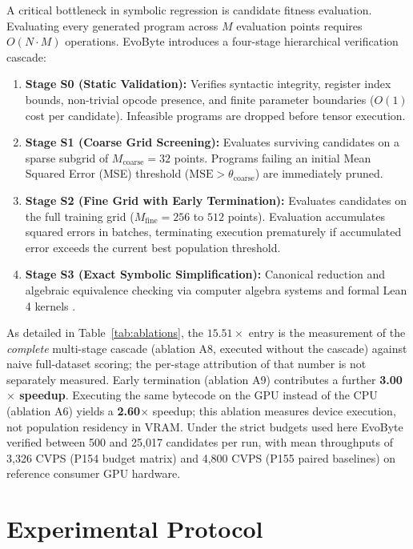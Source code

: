 \documentclass[11pt,a4paper]{article}
\begin{document}
A critical bottleneck in symbolic regression is candidate fitness evaluation. Evaluating every generated program across $M$ evaluation points requires $O(N \cdot M)$ operations. EvoByte introduces a four-stage hierarchical verification cascade:
\begin{enumerate}
    \item \textbf{Stage S0 (Static Validation):} Verifies syntactic integrity, register index bounds, non-trivial opcode presence, and finite parameter boundaries ($O(1)$ cost per candidate). Infeasible programs are dropped before tensor execution.
    \item \textbf{Stage S1 (Coarse Grid Screening):} Evaluates surviving candidates on a sparse subgrid of $M_{\text{coarse}} = 32$ points. Programs failing an initial Mean Squared Error (MSE) threshold ($\text{MSE} > \theta_{\text{coarse}}$) are immediately pruned.
    \item \textbf{Stage S2 (Fine Grid with Early Termination):} Evaluates candidates on the full training grid ($M_{\text{fine}} = 256$ to $512$ points). Evaluation accumulates squared errors in batches, terminating execution prematurely if accumulated error exceeds the current best population threshold.
    \item \textbf{Stage S3 (Exact Symbolic Simplification):} Canonical reduction and algebraic equivalence checking via computer algebra systems and formal Lean 4 kernels \cite{demoura2021lean4}.
\end{enumerate}



As detailed in Table~\ref{tab:ablations}, the $15.51\times$ entry is the measurement of the
\emph{complete} multi-stage cascade (ablation A8, executed without the cascade) against naive
full-dataset scoring; the per-stage attribution of that number is not separately measured.
Early termination (ablation A9) contributes a further \textbf{3.00$\times$ speedup}. Executing
the same bytecode on the GPU instead of the CPU (ablation A6) yields a \textbf{2.60$\times$}
speedup; this ablation measures device execution, not population residency in VRAM. Under the
strict budgets used here EvoByte verified between 500 and 25{,}017 candidates per run, with mean
throughputs of 3{,}326 CVPS (P154 budget matrix) and 4{,}800 CVPS (P155 paired baselines) on
reference consumer GPU hardware.

\section{Experimental Protocol}
\end{document}

